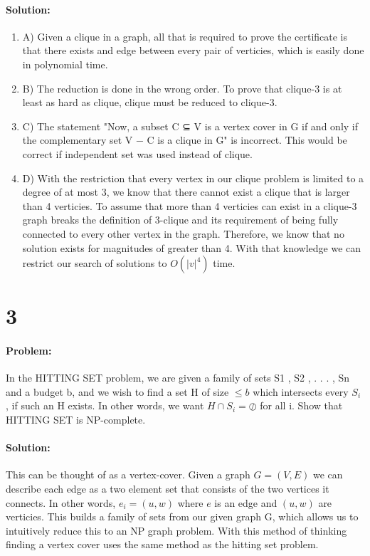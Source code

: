 \documentclass[12pt]{article}
\begin{document}
\paragraph{Solution:}
\begin{enumerate}
\item A) Given a clique in a graph, all that is required to prove the certificate
    is that there exists and edge between every pair of verticies, which is easily
    done in polynomial time.
\item B) The reduction is done in the wrong order.  To prove that clique-3 is at
    least as hard as clique, clique must be reduced to clique-3.
\item C) The statement "Now, a subset C ⊆ V is a vertex cover in G if and only
    if the complementary set V − C is a clique in G" is incorrect.  This would
    be correct if independent set was used instead of clique.
\item D) With the restriction that every vertex in our clique problem is limited
    to a degree of at most 3, we know that there cannot exist a clique that is
    larger than 4 verticies.  To assume that more than 4 verticies can exist in
    a clique-3 graph breaks the definition of 3-clique and its requirement of
    being fully connected to every other vertex in the graph.  Therefore, we
    know that no solution exists for magnitudes of greater than 4.  With that
    knowledge we can restrict our search of solutions to $O(|v|^{4})$ time.
\end{enumerate}


\section*{3}
\paragraph{Problem:}
In the HITTING SET problem, we are given a family of sets {S1 , S2 , . . . , Sn } and a budget b, and
we wish to find a set H of size $\le b$ which intersects every $S_i$ , if such an H exists. In other words,
we want $H \cap S_i = \oslash$ for all i.
Show that
HITTING SET
is NP-complete.

\paragraph{Solution:}
This can be thought of as a vertex-cover.  Given a graph $G=(V,E)$ we can
describe each edge as a two element set that consists of the two vertices it
connects.  In other words, $e_i = (u,w)$ where $e$ is an edge and $(u,w)$ are
verticies.  This builds a family of sets from our given graph G, which allows
us to intuitively reduce this to an NP graph problem.  With this method of
thinking finding a vertex cover uses the same method as the hitting set problem.
\end{document}
